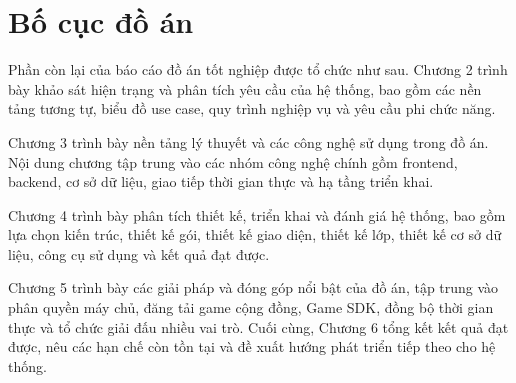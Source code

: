 \documentclass[../DoAn.tex]{subfiles}
\begin{document}
\section{Bố cục đồ án}
\label{section:1.4}

Phần còn lại của báo cáo đồ án tốt nghiệp được tổ chức như sau. Chương 2 trình bày khảo sát hiện trạng và phân tích yêu cầu của hệ thống, bao gồm các nền tảng tương tự, biểu đồ use case, quy trình nghiệp vụ và yêu cầu phi chức năng.

Chương 3 trình bày nền tảng lý thuyết và các công nghệ sử dụng trong đồ án. Nội dung chương tập trung vào các nhóm công nghệ chính gồm frontend, backend, cơ sở dữ liệu, giao tiếp thời gian thực và hạ tầng triển khai.

Chương 4 trình bày phân tích thiết kế, triển khai và đánh giá hệ thống, bao gồm lựa chọn kiến trúc, thiết kế gói, thiết kế giao diện, thiết kế lớp, thiết kế cơ sở dữ liệu, công cụ sử dụng và kết quả đạt được.

Chương 5 trình bày các giải pháp và đóng góp nổi bật của đồ án, tập trung vào phân quyền máy chủ, đăng tải game cộng đồng, Game SDK, đồng bộ thời gian thực và tổ chức giải đấu nhiều vai trò. Cuối cùng, Chương 6 tổng kết kết quả đạt được, nêu các hạn chế còn tồn tại và đề xuất hướng phát triển tiếp theo cho hệ thống.
\end{document}
